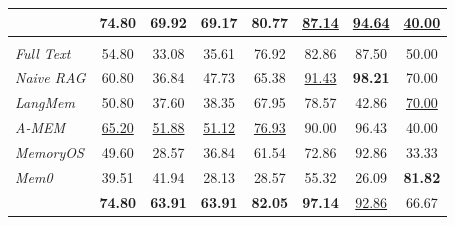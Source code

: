 \begin{table}[htbp]
{\begin{threeparttable}
\begin{tabular}{lccccccc}
\rowcolor{gptgray} \ours{}  & \textbf{74.80} & \textbf{69.92} & \textbf{69.17} & \textbf{80.77} & \underline{87.14} & \underline{94.64} & \underline{40.00} \\\midrule

\rowcolor{qwenbar}\multicolumn{8}{c}{$\vcenter{\hbox{\qwenlogo}}$\ \textbf{Qwen3-30B-A3B-Instruct-2507}}\\
\midrule
\rowcolor{qwenlav} \textit{Full Text}  & 54.80 & 33.08 & 35.61 & 76.92 & 82.86 & 87.50 & 50.00 \\
\rowcolor{qwenlav} \textit{Naive RAG}  & 60.80 & 36.84 & 47.73 & 65.38 & \underline{91.43} & \textbf{98.21} & 70.00 \\
\rowcolor{qwenlav} \textit{LangMem}   &  50.80 & 37.60 & 38.35 & 67.95 & 78.57 & 42.86 & \underline{70.00} \\
\rowcolor{qwenlav} \textit{A-MEM}    &  \underline{65.20} & \underline{51.88} & \underline{51.12} & \underline{76.93} & 90.00 & 96.43 & 40.00 \\
\rowcolor{qwenlav} \textit{MemoryOS}  &  49.60 & 28.57 & 36.84 & 61.54 & 72.86 & 92.86 & 33.33 \\
\rowcolor{qwenlav} \textit{Mem0}   &  39.51 & 41.94 & 28.13 & 28.57 & 55.32 & 26.09 & \textbf{81.82} \\
\rowcolor{qwenlav} \ours{}  &\textbf{74.80}  &\textbf{63.91} &\textbf{63.91} & \textbf{82.05} & \textbf{97.14} &  \underline{92.86} &66.67\\

\bottomrule
\end{tabular}
\end{threeparttable}
}
\label{tab:catwise_acc_longmemeval}
\end{table}
